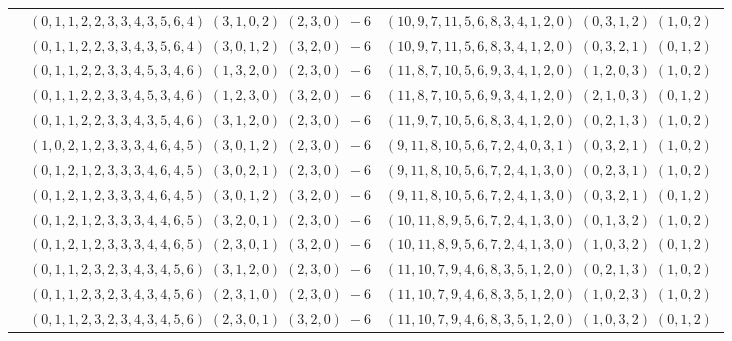 \documentclass[11pt]{article}
\begin{document}
\begin{longtable}[l]{|c|c|c|}
 \cline{2-3} 
 & $(0 ,1 ,1 ,2 ,2 ,3 ,3 ,4 ,3 ,5 ,6 ,4) \;(3 ,1 ,0 ,2) \;(2 ,3 ,0) \;-6$ & $(10 ,9 ,7 ,11 ,5 ,6 ,8 ,3 ,4 ,1 ,2 ,0) \;(0 ,3 ,1 ,2) \;(1 ,0 ,2) \;$\\ 
 \cline{2-3} 
 & $(0 ,1 ,1 ,2 ,2 ,3 ,3 ,4 ,3 ,5 ,6 ,4) \;(3 ,0 ,1 ,2) \;(3 ,2 ,0) \;-6$ & $(10 ,9 ,7 ,11 ,5 ,6 ,8 ,3 ,4 ,1 ,2 ,0) \;(0 ,3 ,2 ,1) \;(0 ,1 ,2) \;$\\ 
 \cline{2-3} 
 & $(0 ,1 ,1 ,2 ,2 ,3 ,3 ,4 ,5 ,3 ,4 ,6) \;(1 ,3 ,2 ,0) \;(2 ,3 ,0) \;-6$ & $(11 ,8 ,7 ,10 ,5 ,6 ,9 ,3 ,4 ,1 ,2 ,0) \;(1 ,2 ,0 ,3) \;(1 ,0 ,2) \;$\\ 
 \cline{2-3} 
 & $(0 ,1 ,1 ,2 ,2 ,3 ,3 ,4 ,5 ,3 ,4 ,6) \;(1 ,2 ,3 ,0) \;(3 ,2 ,0) \;-6$ & $(11 ,8 ,7 ,10 ,5 ,6 ,9 ,3 ,4 ,1 ,2 ,0) \;(2 ,1 ,0 ,3) \;(0 ,1 ,2) \;$\\ 
 \cline{2-3} 
 & $(0 ,1 ,1 ,2 ,2 ,3 ,3 ,4 ,3 ,5 ,4 ,6) \;(3 ,1 ,2 ,0) \;(2 ,3 ,0) \;-6$ & $(11 ,9 ,7 ,10 ,5 ,6 ,8 ,3 ,4 ,1 ,2 ,0) \;(0 ,2 ,1 ,3) \;(1 ,0 ,2) \;$\\ 
 \cline{2-3} 
 & $(1 ,0 ,2 ,1 ,2 ,3 ,3 ,3 ,4 ,6 ,4 ,5) \;(3 ,0 ,1 ,2) \;(2 ,3 ,0) \;-6$ & $(9 ,11 ,8 ,10 ,5 ,6 ,7 ,2 ,4 ,0 ,3 ,1) \;(0 ,3 ,2 ,1) \;(1 ,0 ,2) \;$\\ 
 \cline{2-3} 
 & $(0 ,1 ,2 ,1 ,2 ,3 ,3 ,3 ,4 ,6 ,4 ,5) \;(3 ,0 ,2 ,1) \;(2 ,3 ,0) \;-6$ & $(9 ,11 ,8 ,10 ,5 ,6 ,7 ,2 ,4 ,1 ,3 ,0) \;(0 ,2 ,3 ,1) \;(1 ,0 ,2) \;$\\ 
 \cline{2-3} 
 & $(0 ,1 ,2 ,1 ,2 ,3 ,3 ,3 ,4 ,6 ,4 ,5) \;(3 ,0 ,1 ,2) \;(3 ,2 ,0) \;-6$ & $(9 ,11 ,8 ,10 ,5 ,6 ,7 ,2 ,4 ,1 ,3 ,0) \;(0 ,3 ,2 ,1) \;(0 ,1 ,2) \;$\\ 
 \cline{2-3} 
 & $(0 ,1 ,2 ,1 ,2 ,3 ,3 ,3 ,4 ,4 ,6 ,5) \;(3 ,2 ,0 ,1) \;(2 ,3 ,0) \;-6$ & $(10 ,11 ,8 ,9 ,5 ,6 ,7 ,2 ,4 ,1 ,3 ,0) \;(0 ,1 ,3 ,2) \;(1 ,0 ,2) \;$\\ 
 \cline{2-3} 
 & $(0 ,1 ,2 ,1 ,2 ,3 ,3 ,3 ,4 ,4 ,6 ,5) \;(2 ,3 ,0 ,1) \;(3 ,2 ,0) \;-6$ & $(10 ,11 ,8 ,9 ,5 ,6 ,7 ,2 ,4 ,1 ,3 ,0) \;(1 ,0 ,3 ,2) \;(0 ,1 ,2) \;$\\ 
 \cline{2-3} 
 & $(0 ,1 ,1 ,2 ,3 ,2 ,3 ,4 ,3 ,4 ,5 ,6) \;(3 ,1 ,2 ,0) \;(2 ,3 ,0) \;-6$ & $(11 ,10 ,7 ,9 ,4 ,6 ,8 ,3 ,5 ,1 ,2 ,0) \;(0 ,2 ,1 ,3) \;(1 ,0 ,2) \;$\\ 
 \cline{2-3} 
 & $(0 ,1 ,1 ,2 ,3 ,2 ,3 ,4 ,3 ,4 ,5 ,6) \;(2 ,3 ,1 ,0) \;(2 ,3 ,0) \;-6$ & $(11 ,10 ,7 ,9 ,4 ,6 ,8 ,3 ,5 ,1 ,2 ,0) \;(1 ,0 ,2 ,3) \;(1 ,0 ,2) \;$\\ 
 \cline{2-3} 
 & $(0 ,1 ,1 ,2 ,3 ,2 ,3 ,4 ,3 ,4 ,5 ,6) \;(2 ,3 ,0 ,1) \;(3 ,2 ,0) \;-6$ & $(11 ,10 ,7 ,9 ,4 ,6 ,8 ,3 ,5 ,1 ,2 ,0) \;(1 ,0 ,3 ,2) \;(0 ,1 ,2) \;$\\ 

\end{longtable}
\end{document}
